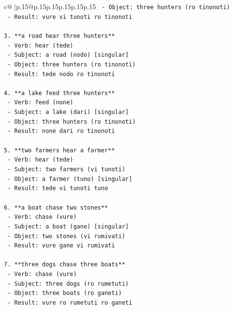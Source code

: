 \documentclass{article}
\begin{document}
{\begin{supertabular}{c@{$\;$}|p{.15\linewidth}@{}p{.15\linewidth}p{.15\linewidth}p{.15\linewidth}p{.15\linewidth}p{.15\linewidth}}
{{{\texttt{   {-} Object: three hunters (ro tinonoti)} \\
\texttt{   {-} Result: vure vi tunoti ro tinonoti} \\
\\ 
\texttt{3. **a road hear three hunters**} \\
\texttt{   {-} Verb: hear (tede)} \\
\texttt{   {-} Subject: a road (nodo) {[}singular{]}} \\
\texttt{   {-} Object: three hunters (ro tinonoti)} \\
\texttt{   {-} Result: tede nodo ro tinonoti} \\
\\ 
\texttt{4. **a lake feed three hunters**} \\
\texttt{   {-} Verb: feed (none)} \\
\texttt{   {-} Subject: a lake (dari) {[}singular{]}} \\
\texttt{   {-} Object: three hunters (ro tinonoti)} \\
\texttt{   {-} Result: none dari ro tinonoti} \\
\\ 
\texttt{5. **two farmers hear a farmer**} \\
\texttt{   {-} Verb: hear (tede)} \\
\texttt{   {-} Subject: two farmers (vi tunoti)} \\
\texttt{   {-} Object: a farmer (tuno) {[}singular{]}} \\
\texttt{   {-} Result: tede vi tunoti tuno} \\
\\ 
\texttt{6. **a boat chase two stones**} \\
\texttt{   {-} Verb: chase (vure)} \\
\texttt{   {-} Subject: a boat (gane) {[}singular{]}} \\
\texttt{   {-} Object: two stones (vi rumivati)} \\
\texttt{   {-} Result: vure gane vi rumivati} \\
\\ 
\texttt{7. **three dogs chase three boats**} \\
\texttt{   {-} Verb: chase (vure)} \\
\texttt{   {-} Subject: three dogs (ro rumetuti)} \\
\texttt{   {-} Object: three boats (ro ganeti)} \\
\texttt{   {-} Result: vure ro rumetuti ro ganeti} \\
}}}
\end{supertabular}}
\end{document}
